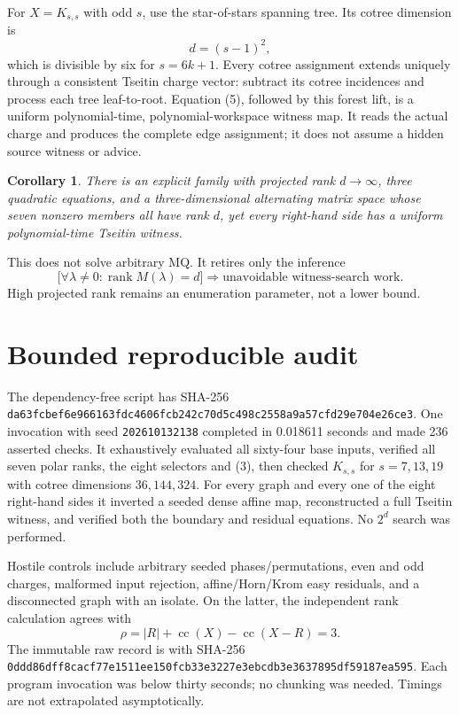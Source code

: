 \documentclass[11pt]{article}
\newtheorem{corollary}[theorem]{Corollary}
\begin{document}
For $X=K_{s,s}$ with odd $s$, use the star-of-stars spanning tree.  Its
cotree dimension is
\[
 d=(s-1)^2,
\]
which is divisible by six for $s=6k+1$.  Every cotree assignment extends
uniquely through a consistent Tseitin charge vector: subtract its cotree
incidences and process each tree leaf-to-root.  Equation (5), followed by this
forest lift, is a uniform polynomial-time, polynomial-workspace witness map.
It reads the actual charge and produces the complete edge assignment; it does
not assume a hidden source witness or advice.

\begin{corollary}
There is an explicit family with projected rank $d\to\infty$, three
quadratic equations, and a three-dimensional alternating matrix space whose
seven nonzero members all have rank $d$, yet every right-hand side has a
uniform polynomial-time Tseitin witness.
\end{corollary}

This does not solve arbitrary MQ.  It retires only the inference
\[
 \bigl[\forall\lambda\ne0:\operatorname{rank}M(\lambda)=d\bigr]
 \Longrightarrow \text{unavoidable witness-search work}.               \tag{6}
\]
High projected rank remains an enumeration parameter, not a lower bound.

\section{Bounded reproducible audit}
The dependency-free script
has SHA-256
\texttt{da63fcbef6e966163fdc4606fcb242c70d5c498c2558a9a57cfd29e704e26ce3}.
One invocation with seed \texttt{202610132138} completed in 0.018611 seconds
and made 236 asserted checks.  It exhaustively evaluated all sixty-four base
inputs, verified all seven polar ranks, the eight selectors and (3), then
checked $K_{s,s}$ for $s=7,13,19$ with cotree dimensions $36,144,324$.
For every graph and every one of the eight right-hand sides it inverted a
seeded dense affine map, reconstructed a full Tseitin witness, and verified
both the boundary and residual equations.  No $2^d$ search was performed.

Hostile controls include arbitrary seeded phases/permutations, even and odd
charges, malformed input rejection, affine/Horn/Krom easy residuals, and a
disconnected graph with an isolate.  On the latter, the independent rank
calculation agrees with
\[
 \rho=|R|+\operatorname{cc}(X)-\operatorname{cc}(X-R)=3.
\]
The immutable raw record is
with SHA-256
\texttt{0ddd86dff8cacf77e1511ee150fcb33e3227e3ebcdb3e3637895df59187ea595}.
Each program invocation was below thirty seconds; no chunking was needed.
Timings are not extrapolated asymptotically.
\end{document}
